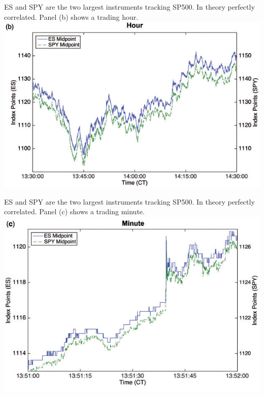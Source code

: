 \documentclass[english,10pt
,aspectratio=169
]{beamer}
\begin{document}
\begin{frame}[noframenumbering]{\citet*{budish_high-frequency_2015}}
	ES and SPY are the two largest instruments tracking SP500. In theory perfectly correlated. Panel (b) shows a trading hour.
	\center
	\includegraphics[scale=0.7]{pics/HTF_Corr_2}
\end{frame}


\begin{frame}[noframenumbering]{\citet*{budish_high-frequency_2015}}
	ES and SPY are the two largest instruments tracking SP500. In theory perfectly correlated. Panel (c) shows a trading minute.
	\center
	\includegraphics[scale=0.7]{pics/HTF_Corr_3}
\end{frame}
\end{document}
